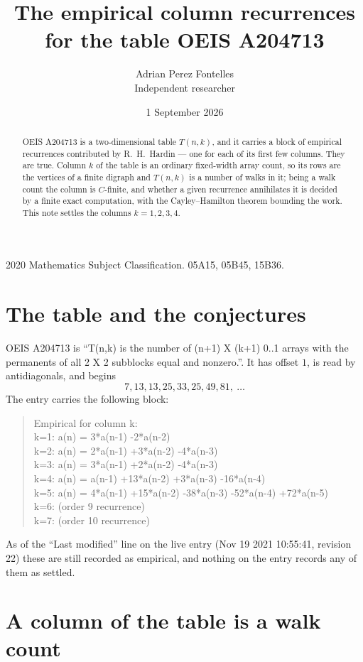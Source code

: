 \documentclass[11pt,a4paper]{article}
\title{The empirical column recurrences for the table OEIS A204713}
\author{Adrian Perez Fontelles\\ \small Independent researcher}
\date{1 September 2026}
\theoremstyle{plain}
\theoremstyle{definition}
\begin{document}
\maketitle

\begin{abstract}
OEIS A204713 is a two-dimensional table $T(n,k)$, and it carries a block of empirical
recurrences contributed by R.~H.~Hardin --- one for each of its first few columns. They are
true. Column $k$ of the table is an ordinary fixed-width array count, so its rows are the
vertices of a finite digraph and $T(n,k)$ is a number of walks in it; being a walk count the
column is $C$-finite, and whether a given recurrence annihilates it is decided by a finite
exact computation, with the Cayley--Hamilton theorem bounding the work. This note settles the columns $k=1, 2, 3, 4$.
\end{abstract}

\noindent\small 2020 Mathematics Subject Classification. 05A15, 05B45, 15B36.\normalsize

\section{The table and the conjectures}

OEIS A204713 is ``T(n,k) is the number of (n+1) X (k+1) 0..1 arrays with the permanents of all 2 X 2 subblocks equal and nonzero.''. It has offset $1$, is
read by antidiagonals, and begins
\[
7, 13, 13, 25, 33, 25, 49, 81,\ \dots
\]
The entry carries the following block:
\begin{quote}\small
Empirical for column k:\\
k=1: a(n) = 3*a(n-1) -2*a(n-2)\\
k=2: a(n) = 2*a(n-1) +3*a(n-2) -4*a(n-3)\\
k=3: a(n) = 3*a(n-1) +2*a(n-2) -4*a(n-3)\\
k=4: a(n) = a(n-1) +13*a(n-2) +3*a(n-3) -16*a(n-4)\\
k=5: a(n) = 4*a(n-1) +15*a(n-2) -38*a(n-3) -52*a(n-4) +72*a(n-5)\\
k=6: (order 9 recurrence)\\
k=7: (order 10 recurrence)\\
\end{quote}
As of the ``Last modified'' line on the live entry (Nov 19 2021 10:55:41, revision 22) these are still
recorded as empirical, and nothing on the entry records any of them as settled.

\section{A column of the table is a walk count}
\end{document}
